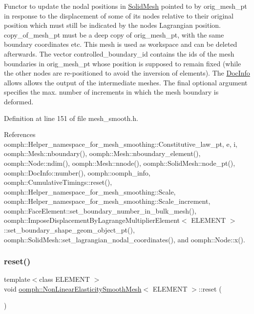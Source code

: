 Functor to update the nodal positions in \hyperlink{classoomph_1_1SolidMesh}{Solid\+Mesh} pointed to by orig\+\_\+mesh\+\_\+pt in response to the displacement of some of its nodes relative to their original position which must still be indicated by the nodes\textquotesingle{} Lagrangian position. copy\+\_\+of\+\_\+mesh\+\_\+pt must be a deep copy of orig\+\_\+mesh\+\_\+pt, with the same boundary coordinates etc. This mesh is used as workspace and can be deleted afterwards. The vector controlled\+\_\+boundary\+\_\+id contains the ids of the mesh boundaries in orig\+\_\+mesh\+\_\+pt whose position is supposed to remain fixed (while the other nodes are re-\/positioned to avoid the inversion of elements). The \hyperlink{classoomph_1_1DocInfo}{Doc\+Info} allows allows the output of the intermediate meshes. The final optional argument specifies the max. number of increments in which the mesh boundary is deformed. 



Definition at line 151 of file mesh\+\_\+smooth.\+h.



References oomph\+::\+Helper\+\_\+namespace\+\_\+for\+\_\+mesh\+\_\+smoothing\+::\+Constitutive\+\_\+law\+\_\+pt, e, i, oomph\+::\+Mesh\+::nboundary(), oomph\+::\+Mesh\+::nboundary\+\_\+element(), oomph\+::\+Node\+::ndim(), oomph\+::\+Mesh\+::nnode(), oomph\+::\+Solid\+Mesh\+::node\+\_\+pt(), oomph\+::\+Doc\+Info\+::number(), oomph\+::oomph\+\_\+info, oomph\+::\+Cumulative\+Timings\+::reset(), oomph\+::\+Helper\+\_\+namespace\+\_\+for\+\_\+mesh\+\_\+smoothing\+::\+Scale, oomph\+::\+Helper\+\_\+namespace\+\_\+for\+\_\+mesh\+\_\+smoothing\+::\+Scale\+\_\+increment, oomph\+::\+Face\+Element\+::set\+\_\+boundary\+\_\+number\+\_\+in\+\_\+bulk\+\_\+mesh(), oomph\+::\+Impose\+Displacement\+By\+Lagrange\+Multiplier\+Element$<$ E\+L\+E\+M\+E\+N\+T $>$\+::set\+\_\+boundary\+\_\+shape\+\_\+geom\+\_\+object\+\_\+pt(), oomph\+::\+Solid\+Mesh\+::set\+\_\+lagrangian\+\_\+nodal\+\_\+coordinates(), and oomph\+::\+Node\+::x().

\mbox{\label{classoomph_1_1NonLinearElasticitySmoothMesh_a7c6d16d244b89aece322e31cb4c83588}} 
\subsubsection{\texorpdfstring{reset()}{reset()}}
{\footnotesize\ttfamily template$<$class E\+L\+E\+M\+E\+NT $>$ \\
void \hyperlink{classoomph_1_1NonLinearElasticitySmoothMesh}{oomph\+::\+Non\+Linear\+Elasticity\+Smooth\+Mesh}$<$ E\+L\+E\+M\+E\+NT $>$\+::reset (\begin{DoxyParamCaption}{ }\end{DoxyParamCaption})\hspace{0.3cm}{\ttfamily [inline]}}

